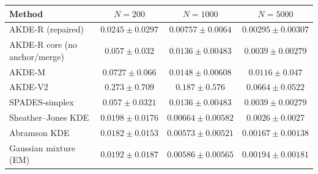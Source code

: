 \begin{tabular}{lccc}
\toprule
Method & $N=200$ & $N=1000$ & $N=5000$ \\
\midrule
AKDE-R (repaired) & $0.0245 \pm 0.0297$ & $0.00757 \pm 0.0064$ & $0.00295 \pm 0.00307$ \\
AKDE-R core (no anchor/merge) & $0.057 \pm 0.032$ & $0.0136 \pm 0.00483$ & $0.0039 \pm 0.00279$ \\
AKDE-M & $0.0727 \pm 0.066$ & $0.0148 \pm 0.00608$ & $0.0116 \pm 0.047$ \\
AKDE-V2 & $0.273 \pm 0.709$ & $0.187 \pm 0.576$ & $0.0664 \pm 0.0522$ \\
SPADES-simplex & $0.057 \pm 0.0321$ & $0.0136 \pm 0.00483$ & $0.0039 \pm 0.00279$ \\
Sheather--Jones KDE & $0.0198 \pm 0.0176$ & $0.00664 \pm 0.00582$ & $0.0026 \pm 0.0027$ \\
Abramson KDE & $0.0182 \pm 0.0153$ & $0.00573 \pm 0.00521$ & $0.00167 \pm 0.00138$ \\
Gaussian mixture (EM) & $0.0192 \pm 0.0187$ & $0.00586 \pm 0.00565$ & $0.00194 \pm 0.00181$ \\
\bottomrule
\end{tabular}